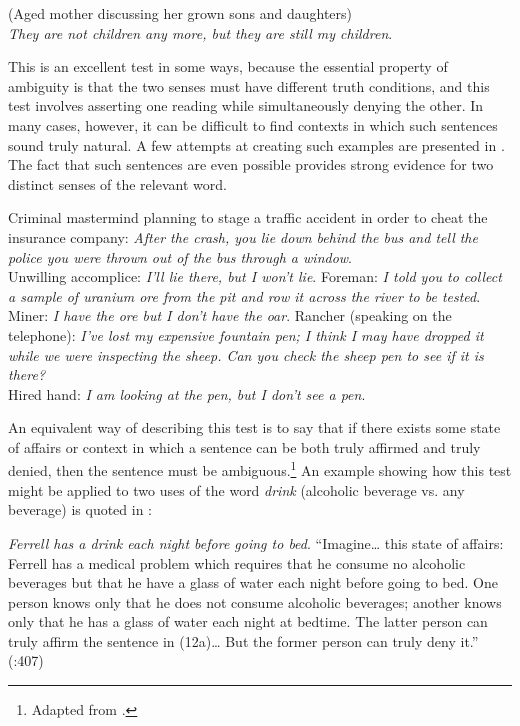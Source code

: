 \ea \label{ex:5.10}
(Aged mother discussing her grown sons and daughters)\\
\textit{They are not children any more, but they are still my children}.
\z


This is an excellent test in some ways, because the essential property of ambiguity is that the two senses must have different truth conditions, and this test involves asserting one reading while simultaneously denying the other. In many cases, however, it can be difficult to find contexts in which such sentences sound truly natural. A few attempts at creating such examples are presented in . The fact that such sentences are even possible provides strong evidence for two distinct senses of the relevant word.


\ea \label{ex:5.11}
\ea  Criminal mastermind planning to stage a traffic accident in order to cheat the insurance company: \textit{After the crash, you lie down behind the bus and tell the police you were thrown out of the bus through a window}.\\
Unwilling accomplice: \textit{I’ll lie there, but I won’t lie}.
\ex   Foreman: \textit{I told you to collect a sample of uranium ore from the pit and row it across the river to be tested}.\\
Miner: \textit{I have the ore but I don’t have the oar}.
\ex   Rancher (speaking on the telephone): \textit{I’ve lost my expensive fountain pen; I think I may have dropped it while we were inspecting the sheep. Can you check the sheep pen to see if it is there?}\\
Hired hand: \textit{I am looking at the pen, but I don’t see a pen}.
\z \z


An equivalent way of describing this test is to say that if there exists some state of affairs or context in which a sentence can be both truly affirmed and truly denied, then the sentence must be ambiguous.\footnote{Adapted from \citet[407]{Gillon1990}.} An example showing how this test might be applied to two uses of the word \textit{drink} (alcoholic beverage vs. any beverage) is quoted in :


\ea \label{ex:5.12}
\ea \textit{Ferrell has a drink each night before going to bed}.
\ex  “Imagine… this state of affairs: Ferrell has a medical problem which requires that he consume no alcoholic beverages but that he have a glass of water each night before going to bed. One person knows only that he does not consume alcoholic beverages; another knows only that he has a glass of water each night at bedtime. The latter person can truly affirm the sentence in (12a)… But the former person can truly deny it.” (\citealt{Gillon1990}:407)
\z \z


